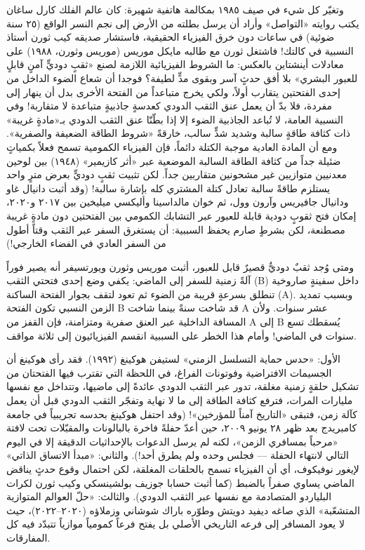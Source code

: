 \documentclass[12pt,a4paper,openany]{book}
\begin{document}
وتغيّر كل شيء في صيف ١٩٨٥ بمكالمة هاتفية شهيرة: كان عالم الفلك كارل ساغان يكتب روايته «التواصل» وأراد أن يرسل بطلته من الأرض إلى نجم النسر الواقع (٢٥ سنة ضوئية) في ساعات دون خرق الفيزياء الحقيقية، فاستشار صديقه كيب ثورن أستاذ النسبية في كالتك! فاشتغل ثورن مع طالبه مايكل موريس (موريس وثورن، ١٩٨٨) على معادلات أينشتاين بالعكس: ما الشروط الفيزيائية اللازمة لصنع «ثقبٍ دوديٍّ آمنٍ قابلٍ للعبور البشري» بلا أفق حدثٍ آسر وبقوى مدٍّ لطيفة؟ فوجدا أن شعاع الضوء الداخل من إحدى الفتحتين يتقارب أولاً، ولكي يخرج متباعداً من الفتحة الأخرى بدل أن ينهار إلى مفردة، فلا بدّ أن يعمل عنق الثقب الدودي كعدسةٍ جاذبيةٍ متباعدة لا متقاربة! وفي النسبية العامة، لا تُباعد الجاذبية الضوء إلا إذا بطّنّا عنق الثقب الدودي بـ«مادةٍ غريبة» ذات كثافة طاقةٍ سالبة وشديد شدٍّ سالب، خارقةً «شروط الطاقة الضعيفة والصفرية». ومع أن المادة العادية موجبة الكتلة دائماً، فإن الفيزياء الكمومية تسمح فعلاً بكمياتٍ ضئيلة جداً من كثافة الطاقة السالبة الموضعية عبر «أثر كازيمير» (١٩٤٨) بين لوحين معدنيين متوازيين غير مشحونين متقاربين جداً. لكن تثبيت ثقبٍ دوديٍّ بعرض مترٍ واحد يستلزم طاقةً سالبة تعادل كتلة المشتري كله بإشارة سالبة! (وقد أثبت دانيال غاو ودانيال جافيريس وآرون وول، ثم خوان مالداسينا وأليكسي ميليخين بين ٢٠١٧ و٢٠٢٠، إمكان فتح ثقوبٍ دودية قابلة للعبور عبر التشابك الكمومي بين الفتحتين دون مادةٍ غريبة مصطنعة، لكن بشرطٍ صارم يحفظ السببية: أن يستغرق السفر عبر الثقب وقتاً أطول من السفر العادي في الفضاء الخارجي!)


ومتى وُجد ثقبٌ دوديٌّ قصيرٌ قابل للعبور، أثبت موريس وثورن ويورتسيفر أنه يصير فوراً آلةً زمنية للسفر إلى الماضي: يكفي وضع إحدى فتحتي الثقب (B) داخل سفينةٍ صاروخية تنطلق بسرعةٍ قريبة من الضوء ثم تعود لتقف بجوار الفتحة الساكنة (A). وبسبب تمديد الزمن النسبي تكون الفتحة B قد شاخت سنةً بينما شاخت A عشر سنوات. ولأن المسافة الداخلية عبر العنق صفرية ومتزامنة، فإن القفز من A إلى B يُسقطك تسع سنوات في الماضي! وأمام هذا الخطر على السببية انقسم الفيزيائيون إلى ثلاثة مواقف.


الأول: «حدس حماية التسلسل الزمني» لستيفن هوكينغ (١٩٩٢). فقد رأى هوكينغ أن الجسيمات الافتراضية وفوتونات الفراغ، في اللحظة التي تقترب فيها الفتحتان من تشكيل حلقةٍ زمنية مغلقة، تدور عبر الثقب الدودي عائدةً إلى ماضيها، وتتداخل مع نفسها مليارات المرات، فترفع كثافة الطاقة إلى ما لا نهاية وتفجّر الثقب الدودي قبل أن يعمل كآلة زمن، فتبقى «التاريخ آمناً للمؤرخين»! (وقد احتفل هوكينغ بحدسه تجريبياً في جامعة كامبريدج بعد ظهر ٢٨ يونيو ٢٠٠٩، حين أعدّ حفلةً فاخرة بالبالونات والمقبّلات تحت لافتة «مرحباً بمسافري الزمن»، لكنه لم يرسل الدعوات بالإحداثيات الدقيقة إلا في اليوم التالي لانتهاء الحفلة — فجلس وحده ولم يطرق أحد!). والثاني: «مبدأ الاتساق الذاتي» لإيغور نوفيكوف، أي أن الفيزياء تسمح بالحلقات المغلقة، لكن احتمال وقوع حدثٍ يناقض الماضي يساوي صفراً بالضبط (كما أثبت حسابا جوزيف بولشينسكي وكيب ثورن لكرات البلياردو المتصادمة مع نفسها عبر الثقب الدودي). والثالث: «حلّ العوالم المتوازية المتشعّبة» الذي صاغه ديفيد دويتش وطوّره باراك شوشاني وزملاؤه (٢٠٢٠–٢٠٢٢)، حيث لا يعود المسافر إلى فرعه التاريخي الأصلي بل يفتح فرعاً كمومياً موازياً تتبدّد فيه كل المفارقات.
\end{document}
